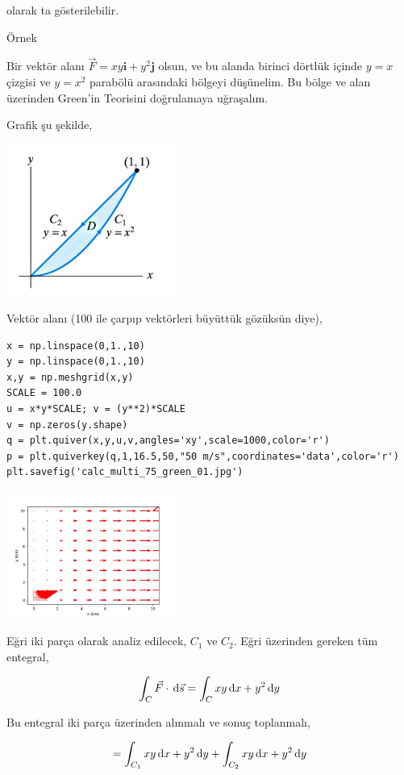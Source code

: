 \documentclass[12pt,fleqn]{article}\usepackage{../../common}
\begin{document}
olarak ta gösterilebilir.

Örnek

Bir vektör alanı $ \vec{F} = xy \textbf{i} + y^2 \textbf{j} $ olsun, ve bu alanda
birinci dörtlük içinde $y = x$ çizgisi ve $y=x^2$ parabölü arasındaki bölgeyi
düşünelim. Bu bölge ve alan üzerinden Green'in Teorisini doğrulamaya uğraşalım.

Grafik şu şekilde,

\includegraphics[width=15em]{calc_multi_75_green_02.jpg}

Vektör alanı (100 ile çarpıp vektörleri büyüttük gözüksün diye),

\begin{verbatim}
x = np.linspace(0,1.,10)
y = np.linspace(0,1.,10)
x,y = np.meshgrid(x,y)
SCALE = 100.0
u = x*y*SCALE; v = (y**2)*SCALE
v = np.zeros(y.shape)
q = plt.quiver(x,y,u,v,angles='xy',scale=1000,color='r')
p = plt.quiverkey(q,1,16.5,50,"50 m/s",coordinates='data',color='r')
plt.savefig('calc_multi_75_green_01.jpg')
\end{verbatim}

\includegraphics[width=15em]{calc_multi_75_green_01.jpg}

Eğri iki parça olarak analiz edilecek, $C_1$ ve $C_2$.  Eğri üzerinden gereken
tüm entegral,

$$
\int_C \vec{F} \cdot \,\mathrm{d}{\vec{s}} = \int_C xy \,\mathrm{d} x + y^2 \,\mathrm{d} y
$$

Bu entegral iki parça üzerinden alınmalı ve sonuç toplanmalı,

$$
= \int_{C_1} xy \,\mathrm{d} x + y^2 \,\mathrm{d} y + \int_{C_2} xy \,\mathrm{d} x + y^2 \,\mathrm{d} y
\label{2}
$$
\end{document}
